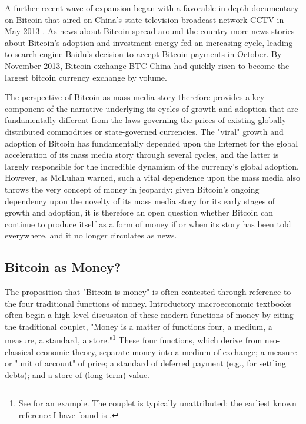 A further recent wave of expansion began with a favorable in-depth documentary on Bitcoin that aired on China's state television broadcast network CCTV in May 2013 \autocite{Stacke13}. As news about Bitcoin spread around the country more news stories about Bitcoin's adoption and investment energy fed an increasing cycle, leading to search engine Baidu's decision to accept Bitcoin payments in October. By November 2013, Bitcoin exchange BTC China had quickly risen to become the largest bitcoin currency exchange by volume.

The perspective of Bitcoin as mass media story therefore provides a key component of the narrative underlying its cycles of growth and adoption that are fundamentally different from the laws governing the prices of existing globally-distributed commodities or state-governed currencies. The "viral" growth and adoption of Bitcoin has fundamentally depended upon the Internet for the global acceleration of its mass media story through several cycles, and the latter is largely responsible for the incredible dynamism of the currency's global adoption. However, as McLuhan warned, such a vital dependence upon the mass media also throws the very concept of money in jeopardy: given Bitcoin's ongoing dependency upon the novelty of its mass media story for its early stages of growth and adoption, it is therefore an open question whether Bitcoin can continue to produce itself as a form of money if or when its story has been told everywhere, and it no longer circulates as news.

\subsection*{Bitcoin as Money?}
The proposition that "Bitcoin is money" is often contested through reference to the four traditional functions of money. Introductory macroeconomic textbooks often begin a high-level discussion of these modern functions of money by citing the traditional couplet, "Money is a matter of functions four, a medium, a measure, a standard, a store."\footnote{
  See \autocite[158]{Dwivedi10} for an example. The couplet is typically unattributed; the earliest known reference I have found is \autocite[55]{Milnes1919}.
}
These four functions, which derive from neo-classical economic theory, separate money into a medium of exchange; a measure or "unit of account" of price; a standard of deferred payment (e.g., for settling debts); and a store of (long-term) value.

